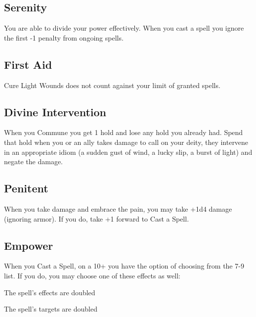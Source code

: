  
\subsection{Serenity}   
 

You are able to divide your power effectively. When you cast a spell you ignore the first -1 penalty from ongoing spells.

 
\subsection{First Aid}   
 

Cure Light Wounds does not count against your limit of granted spells.

 
\subsection{Divine Intervention}    
 

When you Commune you get 1 hold and lose any hold you already had. Spend that hold when you or an ally takes damage to call on your deity, they intervene in an appropriate idiom (a sudden gust of wind, a lucky slip, a burst of light) and negate the damage.

 
\subsection{Penitent}   
 

When you take damage and embrace the pain, you may take +1d4 damage (ignoring armor). If you do, take +1 forward to Cast a Spell.

 
\subsection{Empower}   
 

When you Cast a Spell, on a 10+ you have the option of choosing from the 7-9 list. If you do, you may choose one of these effects as well:

 
\startitemize[1,packed]

\item The spell’s effects are doubled

 
\item The spell’s targets are doubled


\stopitemize
 
